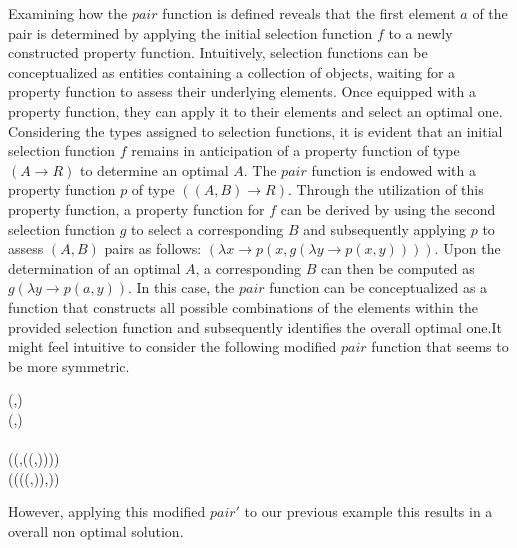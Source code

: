 Examining how the $pair$ function is defined reveals that the first element $a$ of the 
pair is determined by applying the initial selection function $f$ to a newly constructed 
property function. Intuitively, selection functions can be conceptualized as entities 
containing a collection of objects, waiting for a property function to assess their 
underlying elements. Once equipped with a property function, they can apply it to their 
elements and select an optimal one.
Considering the types assigned to selection functions, it is evident that an initial 
selection function $f$ remains in anticipation of a property function of type 
$(A \rightarrow R)$ to determine an optimal $A$. The $pair$ function is endowed with a 
property function $p$ of type $((A,B) \rightarrow R)$. Through the utilization of this 
property function, a property function for $f$ can be derived by using the second 
selection function $g$ to select a corresponding $B$ and subsequently applying $p$ to 
assess $(A,B)$ pairs as follows:
$(\lambda x \rightarrow p (x, g (\lambda y \rightarrow p (x,y))))$. Upon the determination 
of an optimal $A$, a corresponding $B$ can then be computed as 
$g (\lambda y \rightarrow p (a,y))$. In this case, the $pair$ function can be 
conceptualized as a function that constructs all possible combinations of the elements 
within the provided selection function and subsequently identifies the overall optimal 
one.It might feel intuitive to consider the following modified $pair$ function that seems 
to be more symmetric.
\begin{hscode}\SaveRestoreHook
{}%
%
%
%
%
\>[3]{}\mathbin{::}\;\;\to {}\;\;\to {}\;\;(,){}\<[E]%
\\
\>[3]{}\;\;\;\mathrel{=}(,){}\<[E]%
\\
\>[3]{}\<[5]%
\>[5]{}\<[E]%
\\
\>[5]{}\<[9]%
\>[9]{}\mathrel{=}\;(\lambda {}\to {}\;(,\;(\lambda {}\to {}\;(,)))){}\<[E]%
\\
\>[5]{}\<[9]%
\>[9]{}\mathrel{=}\;(\lambda {}\to {}\;(\;(\lambda {}\to {}\;(,)),)){}\<[E]%
\ColumnHook
\end{hscode}\resethooks
However, applying this modified $pair'$ to our previous example this results in a overall 
non optimal solution.

